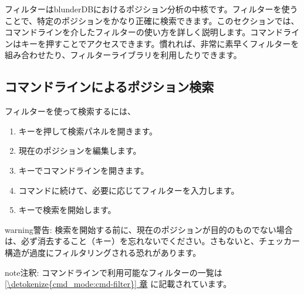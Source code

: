 \documentclass[letterpaper,10pt,dvipdfmx]{sphinxmanual}
\begin{document}
\sphinxAtStartPar
フィルターはblunderDBにおけるポジション分析の中核です。フィルターを使うことで、特定のポジションをかなり正確に検索できます。このセクションでは、コマンドラインを介したフィルターの使い方を詳しく説明します。コマンドラインはキーを押すことでアクセスできます。慣れれば、非常に素早くフィルターを組み合わせたり、フィルターライブラリを利用したりできます。


\subsection{コマンドラインによるポジション検索}
\label{\detokenize{annexe_filtres:recherche-de-positions-en-ligne-de-commande}}
\sphinxAtStartPar
フィルターを使って検索するには、
\begin{enumerate}
%
\item {} 
\sphinxAtStartPar
{}キーを押して検索パネルを開きます。

\item {} 
\sphinxAtStartPar
現在のポジションを編集します。

\item {} 
\sphinxAtStartPar
{}キーでコマンドラインを開きます。

\item {} 
\sphinxAtStartPar
{}コマンドに続けて、必要に応じてフィルターを入力します。

\item {} 
\sphinxAtStartPar
{}キーで検索を開始します。

\end{enumerate}

\begin{sphinxadmonition}{warning}{警告:}
\sphinxAtStartPar
検索を開始する前に、現在のポジションが目的のものでない場合は、必ず消去すること（キー）を忘れないでください。さもないと、チェッカー構造が過度にフィルタリングされる恐れがあります。
\end{sphinxadmonition}

\begin{sphinxadmonition}{note}{注釈:}
\sphinxAtStartPar
コマンドラインで利用可能なフィルターの一覧は \hyperref[\detokenize{cmd_mode:cmd-filter}]{\ref{\detokenize{cmd_mode:cmd-filter}} 章} に記載されています。
\end{sphinxadmonition}
\end{document}
